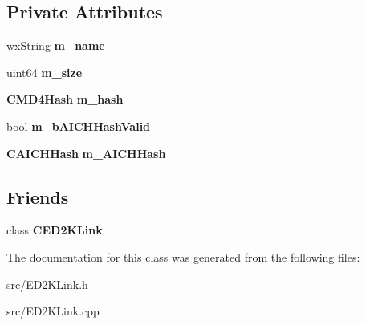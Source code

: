 \subsection*{Private Attributes}
\begin{DoxyCompactItemize}
\item 
wxString {\bfseries m\_\-name}\label{classCED2KFileLink_a7a6c9b10c5a2b9f26a8b1ac6b11e5100}

\item 
uint64 {\bfseries m\_\-size}\label{classCED2KFileLink_ad82b11e2fa856b3ce2c915f2ac70cec4}

\item 
{\bf CMD4Hash} {\bfseries m\_\-hash}\label{classCED2KFileLink_a73fe5fcdf4457f0a1bfb881a854c9e66}

\item 
bool {\bfseries m\_\-bAICHHashValid}\label{classCED2KFileLink_abdc003e10c462efbf4f5132fc0932a6f}

\item 
{\bf CAICHHash} {\bfseries m\_\-AICHHash}\label{classCED2KFileLink_a9e83c33b1d3d673d505a6cb35519230d}

\end{DoxyCompactItemize}
\subsection*{Friends}
\begin{DoxyCompactItemize}
\item 
class {\bf CED2KLink}\label{classCED2KFileLink_a279e7ff00da60d35d82d2fff0a8cba76}

\end{DoxyCompactItemize}


The documentation for this class was generated from the following files:\begin{DoxyCompactItemize}
\item 
src/ED2KLink.h\item 
src/ED2KLink.cpp\end{DoxyCompactItemize}
